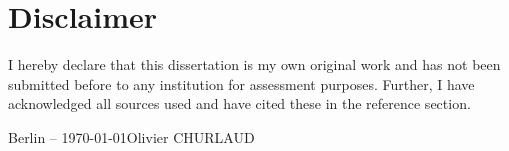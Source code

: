 
\chapter*{Disclaimer}

\vfill

I hereby declare that this dissertation is my own original work and has not been submitted 
before to any institution for assessment purposes.  Further, I have acknowledged all sources used and have cited these in the reference section. 

\vspace{3cm}

\noindent  Berlin -- \today \hfill Olivier CHURLAUD 

\vfill